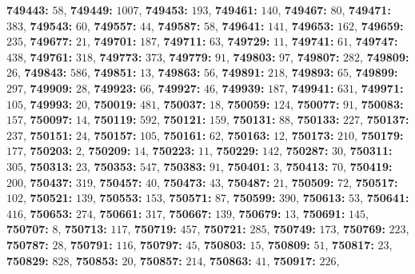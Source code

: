 \textsf{\bfseries 749443:} $58$, \textsf{\bfseries 749449:} $1007$, \textsf{\bfseries 749453:} $193$, \textsf{\bfseries 749461:} $140$, \textsf{\bfseries 749467:} $80$, \textsf{\bfseries 749471:} $383$, \textsf{\bfseries 749543:} $60$, \textsf{\bfseries 749557:} $44$, \textsf{\bfseries 749587:} $58$, \textsf{\bfseries 749641:} $141$, \textsf{\bfseries 749653:} $162$, \textsf{\bfseries 749659:} $235$, \textsf{\bfseries 749677:} $21$, \textsf{\bfseries 749701:} $187$, \textsf{\bfseries 749711:} $63$, \textsf{\bfseries 749729:} $11$, \textsf{\bfseries 749741:} $61$, \textsf{\bfseries 749747:} $438$, \textsf{\bfseries 749761:} $318$, \textsf{\bfseries 749773:} $373$, \textsf{\bfseries 749779:} $91$, \textsf{\bfseries 749803:} $97$, \textsf{\bfseries 749807:} $282$, \textsf{\bfseries 749809:} $26$, \textsf{\bfseries 749843:} $586$, \textsf{\bfseries 749851:} $13$, \textsf{\bfseries 749863:} $56$, \textsf{\bfseries 749891:} $218$, \textsf{\bfseries 749893:} $65$, \textsf{\bfseries 749899:} $297$, \textsf{\bfseries 749909:} $28$, \textsf{\bfseries 749923:} $66$, \textsf{\bfseries 749927:} $46$, \textsf{\bfseries 749939:} $187$, \textsf{\bfseries 749941:} $631$, \textsf{\bfseries 749971:} $105$, \textsf{\bfseries 749993:} $20$, \textsf{\bfseries 750019:} $481$, \textsf{\bfseries 750037:} $18$, \textsf{\bfseries 750059:} $124$, \textsf{\bfseries 750077:} $91$, \textsf{\bfseries 750083:} $157$, \textsf{\bfseries 750097:} $14$, \textsf{\bfseries 750119:} $592$, \textsf{\bfseries 750121:} $159$, \textsf{\bfseries 750131:} $88$, \textsf{\bfseries 750133:} $227$, \textsf{\bfseries 750137:} $237$, \textsf{\bfseries 750151:} $24$, \textsf{\bfseries 750157:} $105$, \textsf{\bfseries 750161:} $62$, \textsf{\bfseries 750163:} $12$, \textsf{\bfseries 750173:} $210$, \textsf{\bfseries 750179:} $177$, \textsf{\bfseries 750203:} $2$, \textsf{\bfseries 750209:} $14$, \textsf{\bfseries 750223:} $11$, \textsf{\bfseries 750229:} $142$, \textsf{\bfseries 750287:} $30$, \textsf{\bfseries 750311:} $305$, \textsf{\bfseries 750313:} $23$, \textsf{\bfseries 750353:} $547$, \textsf{\bfseries 750383:} $91$, \textsf{\bfseries 750401:} $3$, \textsf{\bfseries 750413:} $70$, \textsf{\bfseries 750419:} $200$, \textsf{\bfseries 750437:} $319$, \textsf{\bfseries 750457:} $40$, \textsf{\bfseries 750473:} $43$, \textsf{\bfseries 750487:} $21$, \textsf{\bfseries 750509:} $72$, \textsf{\bfseries 750517:} $102$, \textsf{\bfseries 750521:} $139$, \textsf{\bfseries 750553:} $153$, \textsf{\bfseries 750571:} $87$, \textsf{\bfseries 750599:} $390$, \textsf{\bfseries 750613:} $53$, \textsf{\bfseries 750641:} $416$, \textsf{\bfseries 750653:} $274$, \textsf{\bfseries 750661:} $317$, \textsf{\bfseries 750667:} $139$, \textsf{\bfseries 750679:} $13$, \textsf{\bfseries 750691:} $145$, \textsf{\bfseries 750707:} $8$, \textsf{\bfseries 750713:} $117$, \textsf{\bfseries 750719:} $457$, \textsf{\bfseries 750721:} $285$, \textsf{\bfseries 750749:} $173$, \textsf{\bfseries 750769:} $223$, \textsf{\bfseries 750787:} $28$, \textsf{\bfseries 750791:} $116$, \textsf{\bfseries 750797:} $45$, \textsf{\bfseries 750803:} $15$, \textsf{\bfseries 750809:} $51$, \textsf{\bfseries 750817:} $23$, \textsf{\bfseries 750829:} $828$, \textsf{\bfseries 750853:} $20$, \textsf{\bfseries 750857:} $214$, \textsf{\bfseries 750863:} $41$, \textsf{\bfseries 750917:} $226$, 
